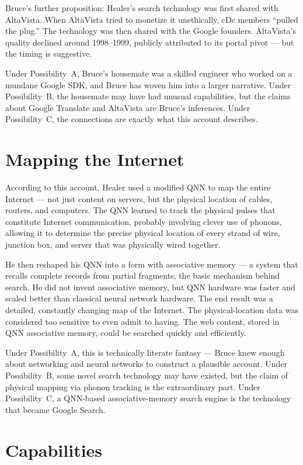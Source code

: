 Bruce's further proposition: Healer's search technology was first shared with AltaVista. When AltaVista tried to monetize it unethically, cDc members ``pulled the plug.'' The technology was then shared with the Google founders. AltaVista's quality declined around 1998--1999, publicly attributed to its portal pivot --- but the timing is suggestive.

Under Possibility~A, Bruce's housemate was a skilled engineer who worked on a mundane Google SDK, and Bruce has woven him into a larger narrative. Under Possibility~B, the housemate may have had unusual capabilities, but the claims about Google Translate and AltaVista are Bruce's inferences. Under Possibility~C, the connections are exactly what this account describes.

\section*{Mapping the Internet}
\label{pos20:mapping-the-internet}

According to this account, Healer used a modified QNN to map the entire Internet --- not just content on servers, but the physical location of cables, routers, and computers. The QNN learned to track the physical pulses that constitute Internet communication, probably involving clever use of phonons, allowing it to determine the precise physical location of every strand of wire, junction box, and server that was physically wired together.

He then reshaped his QNN into a form with associative memory --- a system that recalls complete records from partial fragments, the basic mechanism behind search. He did not invent associative memory, but QNN hardware was faster and scaled better than classical neural network hardware. The end result was a detailed, constantly changing map of the Internet. The physical-location data was considered too sensitive to even admit to having. The web content, stored in QNN associative memory, could be searched quickly and efficiently.

Under Possibility~A, this is technically literate fantasy --- Bruce knew enough about networking and neural networks to construct a plausible account. Under Possibility~B, some novel search technology may have existed, but the claim of physical mapping via phonon tracking is the extraordinary part. Under Possibility~C, a QNN-based associative-memory search engine is the technology that became Google Search.

\section*{Capabilities}
\label{pos20:capabilities}

